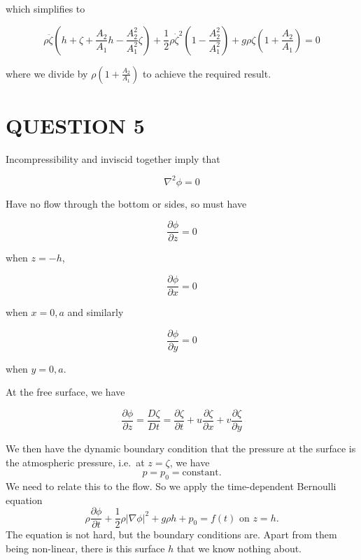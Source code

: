 \documentclass[a4paper]{article}
\begin{document}
which simplifies to

\[ \rho \ddot{\zeta}\left(  h + \zeta + \frac{A_{2}}{A_{1}} h - \frac{A_{2}^{2}}{A_{1}^{2}} \zeta  \right) + \frac{1}{2} \rho \dot{\zeta}^{2} \left(  1 - \frac{A_{2}^{2}}{A_{1}^{2}} \right) + g \rho \zeta \left(  1 + \frac{A_{2}}{A_{1}}\right) = 0      \]

where we divide by $ \rho \left( 1 + \frac{A_{2}}{A_{1}} \right)  $ to achieve the required result.



\section{QUESTION 5}


\begin{center}
\end{center}

Incompressibility and inviscid together imply that 

\[ \nabla^{2} \phi = 0 \]

Have no flow through the bottom or sides, so must have

\[ \frac{\partial \phi }{\partial z} = 0 \]

when $ z = -h $,

\[ \frac{\partial \phi }{\partial x} = 0 \]

when $ x = 0, a $ and similarly 

\[ \frac{\partial \phi }{\partial y} = 0 \]

when $ y = 0,a $.

At the free surface, we have

\[ \frac{\partial \phi }{\partial z} = \frac{D \zeta}{D t} = \frac{\partial \zeta }{\partial t} + u \frac{\partial \zeta }{\partial x} + v \frac{\partial \zeta }{\partial y}  \]

We then have the dynamic boundary condition that the pressure at the surface is the atmospheric pressure, i.e.\ at $z = \zeta$, we have
\[
p = p_0 = \text{constant}.
\]
We need to relate this to the flow. So we apply the time-dependent Bernoulli equation
\[
\rho \frac{\partial \phi}{\partial t} + \frac{1}{2} \rho|\nabla \phi|^2 + g\rho h + p_0 = f(t)\text{ on }z = h.
\]
The equation is not hard, but the boundary conditions are. Apart from them being non-linear, there is this surface $h$ that we know nothing about.
\end{document}
